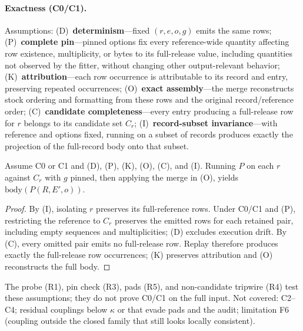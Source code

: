 \paragraph{Exactness (C0/C1).}
\label{asm:det}\label{asm:pin}\label{asm:key}\label{asm:order}%
Assumptions: (D)~\textbf{determinism}---fixed $(r,e,o,g)$ emits the same rows;
(P)~\textbf{complete pin}---pinned options fix every reference-wide quantity
affecting row existence, multiplicity, or bytes to its full-release value,
including quantities not observed by the fitter, without changing other
output-relevant behavior;
(K)~\textbf{attribution}---each row occurrence is attributable to its record
and entry, preserving repeated occurrences;
(O)~\textbf{exact assembly}---the merge reconstructs stock ordering and
formatting from these rows and the original record/reference order;
(C)~\textbf{candidate completeness}---every entry producing a full-release
row for $r$ belongs to its candidate set $C_r$;
(I)~\textbf{record-subset invariance}---with reference and options fixed,
running on a subset of records produces exactly the projection of the
full-record body onto that subset.
\begin{proposition}\label{prop:exact}
Assume C0 or C1 and (D), (P), (K), (O), (C), and (I).
Running $P$ on each $r$ against $C_r$ with $g$ pinned, then applying
the merge in (O), yields $\mathrm{body}(P(R,E',o))$.
\end{proposition}
\begin{proof}
By (I), isolating $r$ preserves its full-reference rows.
Under C0/C1 and (P), restricting the reference to $C_r$ preserves the
emitted rows for each retained pair, including empty sequences and
multiplicities; (D) excludes execution drift. By (C), every omitted pair
emits no full-release row. Replay therefore produces exactly the
full-release row occurrences; (K) preserves attribution and (O)
reconstructs the full body.
\end{proof}
The probe (R1), pin check (R3), pads (R5), and non-candidate tripwire (R4) test
these assumptions; they do not prove C0/C1 on the full input. Not covered:
C2--C4; residual couplings below $\kappa$ or that evade pads and the audit;
limitation F6 (coupling outside the closed family that still looks locally
consistent).

